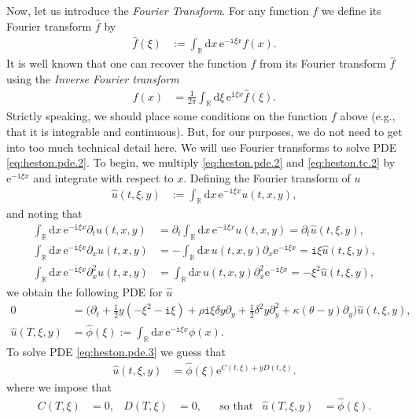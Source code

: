 \documentclass[12pt]{book}
\let\varphi\phi
\numberwithin{equation}{chapter}
\theoremstyle{plain}
\numberwithin{theorem}{section}
\theoremstyle{definition}
\numberwithin{exercise}{chapter}
\newcommand{\<}{\langle}
\renewcommand{\>}{\rangle}
\renewcommand{\(}{\left(}
\renewcommand{\)}{\right)}
\renewcommand{\[}{\left[}
\renewcommand{\]}{\right]}
\newcommand\Rb{\mathds{R}}
\newcommand\del{\delta}
\newcommand\uh{\widehat{u}}
\newcommand\fh{\widehat{f}}
\renewcommand\d{\partial}
\newcommand\ii{\mathtt{i}}
\newcommand\dd{\mathrm{d}}
\newcommand\ee{\mathrm{e}}
\theoremstyle{definition}
\numberwithin{question}{section}
\begin{document}
Now, let us introduce the \textit{Fourier Transform}.  For any function $f$ we define its Fourier transform $\fh$ by
\begin{align}
\fh(\xi)
	&:=	\int_\Rb \dd x \, \ee^{- \ii \xi x} f(x) . \label{eq:ft}
\end{align}
It is well known that one can recover the function $f$ from its Fourier transform $\fh$ using the \textit{Inverse Fourier transform}
\begin{align}
f(x)
	&= \frac{1}{2 \pi} \int_\Rb \dd \xi \, \ee^{\ii \xi x} \fh(\xi) . \label{eq:ift}
\end{align}
Strictly speaking, we should place some conditions on the function $f$ above (e.g., that it is integrable and continuous).  But, for our purposes, we do not need to get into too much technical detail here.  We will use Fourier transforms to solve PDE \eqref{eq:heston.pde.2}.  To begin, we multiply \eqref{eq:heston.pde.2} and \eqref{eq:heston.tc.2} by $\ee^{- \ii \xi x}$ and integrate with respect to $x$.  Defining the Fourier transform of $u$
\begin{align}
\uh(t,\xi,y)
	&:=	\int_\Rb \dd x \, \ee^{- \ii \xi x} u(t,x,y) ,
\end{align}
and noting that
\begin{align}
\int_\Rb \dd x \, \ee^{- \ii \xi x} \d_t u(t,x,y)
	&=	\d_t  \int_\Rb \dd x \, \ee^{- \ii \xi x} u(t,x,y)
	=		\d_t \uh(t,\xi,y) , \\
\int_\Rb \dd x \, \ee^{- \ii \xi x} \d_x u(t,x,y)
	&=	- \int_\Rb \dd x \, u(t,x,y) \d_x \ee^{- \ii \xi x} 
	=		\ii \xi \uh(t,\xi,y) , \\
\int_\Rb \dd x \, \ee^{- \ii \xi x} \d_x^2 u(t,x,y)
	&=	\int_\Rb \dd x \, u(t,x,y) \d_x^2 \ee^{- \ii \xi x} 
	=		- \xi^2 \uh(t,\xi,y) ,
\end{align}
we obtain the following PDE for $\uh$
\begin{align}
0
	&=	\Big (\d_t + \tfrac{1}{2} y (- \xi^2 - \ii \xi ) + \rho \ii \xi \del y \d_y + \tfrac{1}{2} \delta^2 y \d_y^2 + \kappa (\theta - y) \d_y \Big) \uh(t,\xi,y) ,
	\label{eq:heston.pde.3} \\
\uh(T,\xi,y)
	&=	\widehat{\varphi}(\xi) := \int_\Rb \dd x \, \ee^{-\ii \xi x }\varphi(x) . \label{eq:heston.tc.3}
\end{align}
To solve PDE \eqref{eq:heston.pde.3} we guess that
\begin{align}
\uh(t,\xi,y)
	&=	\widehat{\varphi}(\xi) \ee^{C(t,\xi) + y D(t,\xi)} . \label{eq:guess}
\end{align}
where we impose that
\begin{align}
C(T,\xi) 
	&=	0 , &
D(T,\xi)
	&=	0 , &
	&\text{so that}& 
\uh(T,\xi,y) 
	&= \widehat{\varphi}(\xi) .
\end{align}
\end{document}
